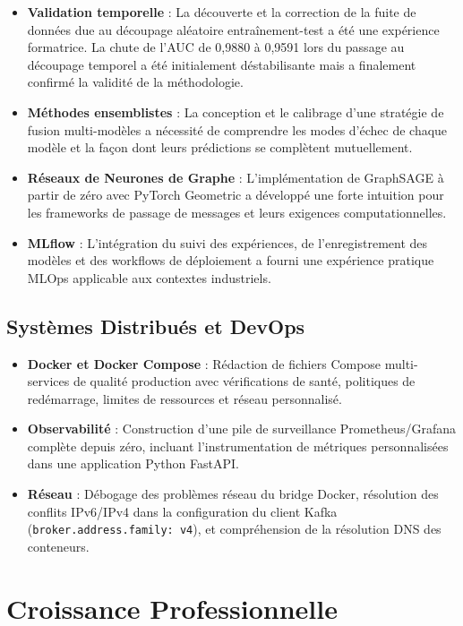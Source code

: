 \documentclass[12pt,a4paper,oneside]{book}
\theoremstyle{definition}
\theoremstyle{plain}
\begin{document}
\begin{itemize}
  \item \textbf{Validation temporelle} : La découverte et la correction de la fuite de données due au découpage aléatoire entraînement-test a été une expérience formatrice. La chute de l'AUC de 0,9880 à 0,9591 lors du passage au découpage temporel a été initialement déstabilisante mais a finalement confirmé la validité de la méthodologie.
  \item \textbf{Méthodes ensemblistes} : La conception et le calibrage d'une stratégie de fusion multi-modèles a nécessité de comprendre les modes d'échec de chaque modèle et la façon dont leurs prédictions se complètent mutuellement.
  \item \textbf{Réseaux de Neurones de Graphe} : L'implémentation de GraphSAGE à partir de zéro avec PyTorch Geometric a développé une forte intuition pour les frameworks de passage de messages et leurs exigences computationnelles.
  \item \textbf{MLflow} : L'intégration du suivi des expériences, de l'enregistrement des modèles et des workflows de déploiement a fourni une expérience pratique MLOps applicable aux contextes industriels.
\end{itemize}

\subsection{Systèmes Distribués et DevOps}

\begin{itemize}
  \item \textbf{Docker et Docker Compose} : Rédaction de fichiers Compose multi-services de qualité production avec vérifications de santé, politiques de redémarrage, limites de ressources et réseau personnalisé.
  \item \textbf{Observabilité} : Construction d'une pile de surveillance Prometheus/Grafana complète depuis zéro, incluant l'instrumentation de métriques personnalisées dans une application Python FastAPI.
  \item \textbf{Réseau} : Débogage des problèmes réseau du bridge Docker, résolution des conflits IPv6/IPv4 dans la configuration du client Kafka (\texttt{broker.address.family: v4}), et compréhension de la résolution DNS des conteneurs.
\end{itemize}

\section{Croissance Professionnelle}
\end{document}
